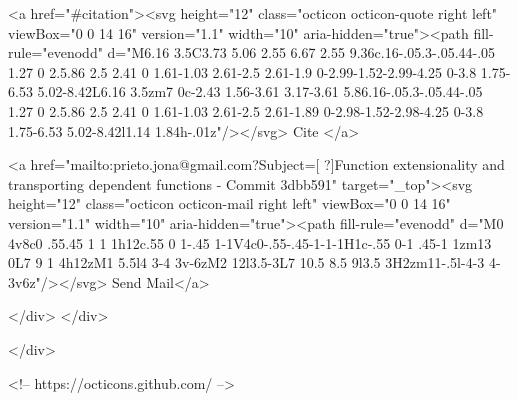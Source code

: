       <a  href="#citation"><svg height="12" class="octicon octicon-quote right left" viewBox="0 0 14 16" version="1.1" width="10" aria-hidden="true"><path fill-rule="evenodd" d="M6.16 3.5C3.73 5.06 2.55 6.67 2.55 9.36c.16-.05.3-.05.44-.05 1.27 0 2.5.86 2.5 2.41 0 1.61-1.03 2.61-2.5 2.61-1.9 0-2.99-1.52-2.99-4.25 0-3.8 1.75-6.53 5.02-8.42L6.16 3.5zm7 0c-2.43 1.56-3.61 3.17-3.61 5.86.16-.05.3-.05.44-.05 1.27 0 2.5.86 2.5 2.41 0 1.61-1.03 2.61-2.5 2.61-1.89 0-2.98-1.52-2.98-4.25 0-3.8 1.75-6.53 5.02-8.42l1.14 1.84h-.01z"/></svg> Cite
      </a>

      <a href="mailto:prieto.jona@gmail.com?Subject=[ ?]Function extensionality and transporting dependent functions  - Commit 3dbb591" target="_top"><svg height="12" class="octicon octicon-mail right left" viewBox="0 0 14 16" version="1.1" width="10" aria-hidden="true"><path fill-rule="evenodd" d="M0 4v8c0 .55.45 1 1 1h12c.55 0 1-.45 1-1V4c0-.55-.45-1-1-1H1c-.55 0-1 .45-1 1zm13 0L7 9 1 4h12zM1 5.5l4 3-4 3v-6zM2 12l3.5-3L7 10.5 8.5 9l3.5 3H2zm11-.5l-4-3 4-3v6z"/></svg> Send Mail</a>

    </div>
  </div>

</div>

<!-- https://octicons.github.com/ -->





